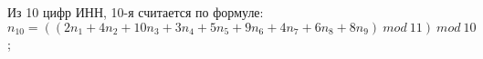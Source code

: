 Из 10 цифр ИНН, 10-я считается по формуле:
$n_{10} = ((2n_1 + 4n_2 + 10n_3 + 3n_4 + 5n_5 + 9n_6 + 4n_7 + 6n_8 + 8n_9) \ mod \ 11) \ mod \ 10 $;
